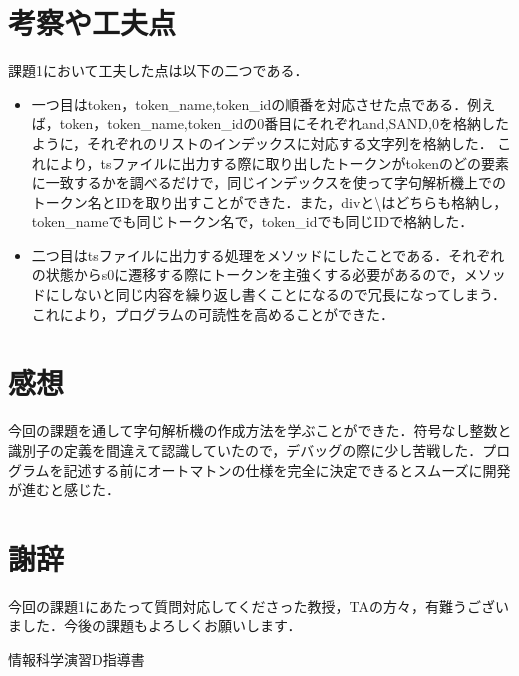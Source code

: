 \documentclass[dvipdfmx]{jarticle}
\begin{document}
\section{考察や工夫点}
課題1において工夫した点は以下の二つである．
\begin{itemize}
    \item 一つ目はtoken，token\_name,token\_idの順番を対応させた点である．例えば，token，token\_name,token\_idの0番目にそれぞれand,SAND,0を格納したように，それぞれのリストのインデックスに対応する文字列を格納した．
    これにより，tsファイルに出力する際に取り出したトークンがtokenのどの要素に一致するかを調べるだけで，同じインデックスを使って字句解析機上でのトークン名とIDを取り出すことができた．また，divと\textbackslash はどちらも格納し，token\_nameでも同じトークン名で，token\_idでも同じIDで格納した．
    \item 二つ目はtsファイルに出力する処理をメソッドにしたことである．それぞれの状態からs0に遷移する際にトークンを主強くする必要があるので，メソッドにしないと同じ内容を繰り返し書くことになるので冗長になってしまう．これにより，プログラムの可読性を高めることができた．
\end{itemize}
\section{感想}
今回の課題を通して字句解析機の作成方法を学ぶことができた．符号なし整数と識別子の定義を間違えて認識していたので，デバッグの際に少し苦戦した．プログラムを記述する前にオートマトンの仕様を完全に決定できるとスムーズに開発が進むと感じた．
\section{謝辞}
今回の課題1にあたって質問対応してくださった教授，TAの方々，有難うございました．今後の課題もよろしくお願いします．
\begin{thebibliography}{1}
     情報科学演習D指導書
\end{thebibliography}
\end{document}
